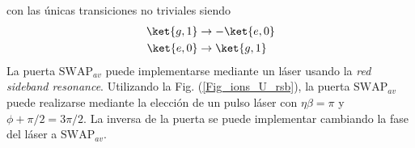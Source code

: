 con las únicas transiciones no triviales siendo 
	\begin{equation} 
	\begin{aligned}
	\ket{g,1} & \rightarrow - \ket{e,0} \\
	\ket{e,0} & \rightarrow \ket{g,1}
	\end{aligned}
	\end{equation}
La puerta $\text{SWAP}_{av}$ puede implementarse mediante un láser usando la \textit{red sideband resonance}. Utilizando la Fig. (\ref{Fig_ions_U_rsb}), la puerta  $\text{SWAP}_{av}$ puede realizarse mediante la elección de un pulso láser con $\eta \beta = \pi$ y $\phi + \pi/2 = 3 \pi/2$. La inversa de la puerta se puede implementar cambiando la fase del láser a  $\text{SWAP}_{av}$.


